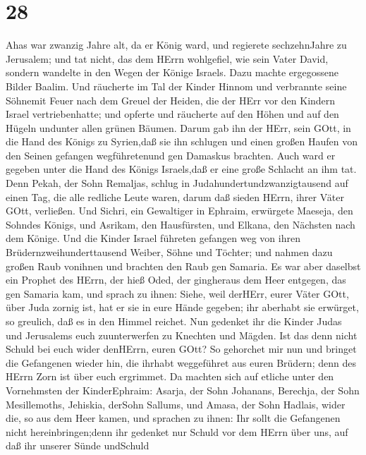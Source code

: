 \hypertarget{section-27}{%
\section{28}\label{section-27}}

 Ahas war zwanzig Jahre alt, da er König ward, und regierete
sechzehnJahre zu Jerusalem; und tat nicht, das dem HErrn wohlgefiel, wie
sein Vater David,  sondern wandelte in den Wegen der Könige
Israels. Dazu machte ergegossene Bilder Baalim.  Und
räucherte im Tal der Kinder Hinnom und verbrannte seine Söhnemit Feuer
nach dem Greuel der Heiden, die der HErr vor den Kindern Israel
vertriebenhatte;  und opferte und räucherte auf den Höhen
und auf den Hügeln undunter allen grünen Bäumen.  Darum gab
ihn der HErr, sein GOtt, in die Hand des Königs zu Syrien,daß sie ihn
schlugen und einen großen Haufen von den Seinen gefangen wegführetenund
gen Damaskus brachten. Auch ward er gegeben unter die Hand des Königs
Israels,daß er eine große Schlacht an ihm tat.  Denn Pekah,
der Sohn Remaljas, schlug in Judahundertundzwanzigtausend auf einen Tag,
die alle redliche Leute waren, darum daß sieden HErrn, ihrer Väter GOtt,
verließen.  Und Sichri, ein Gewaltiger in Ephraim, erwürgete
Maeseja, den Sohndes Königs, und Asrikam, den Hausfürsten, und Elkana,
den Nächsten nach dem Könige.  Und die Kinder Israel
führeten gefangen weg von ihren Brüdernzweihunderttausend Weiber, Söhne
und Töchter; und nahmen dazu großen Raub vonihnen und brachten den Raub
gen Samaria.  Es war aber daselbst ein Prophet des HErrn,
der hieß Oded, der gingheraus dem Heer entgegen, das gen Samaria kam,
und sprach zu ihnen: Siehe, weil derHErr, eurer Väter GOtt, über Juda
zornig ist, hat er sie in eure Hände gegeben; ihr aberhabt sie erwürget,
so greulich, daß es in den Himmel reichet.  Nun gedenket
ihr die Kinder Judas und Jerusalems euch zuunterwerfen zu Knechten und
Mägden. Ist das denn nicht Schuld bei euch wider denHErrn, euren GOtt?
 So gehorchet mir nun und bringet die Gefangenen wieder
hin, die ihrhabt weggeführet aus euren Brüdern; denn des HErrn Zorn ist
über euch ergrimmet.  Da machten sich auf etliche unter den
Vornehmsten der KinderEphraim: Asarja, der Sohn Johanans, Berechja, der
Sohn Mesillemoths, Jehiskia, derSohn Sallums, und Amasa, der Sohn
Hadlais, wider die, so aus dem Heer kamen,  und sprachen zu
ihnen: Ihr sollt die Gefangenen nicht hereinbringen;denn ihr gedenket
nur Schuld vor dem HErrn über uns, auf daß ihr unserer Sünde undSchuld
